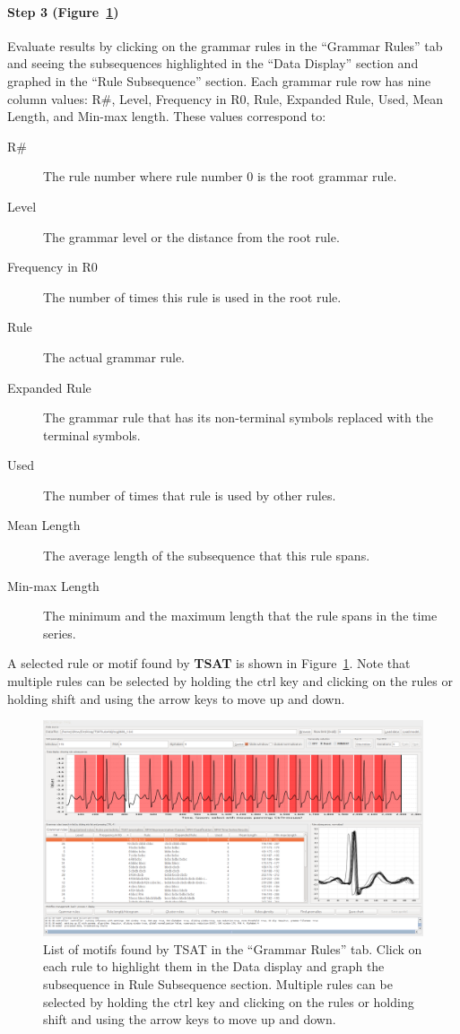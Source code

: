 \documentclass[titlepage, letterpaper, 12pt]{article}
\newcommand\TSAT{\textbf{TSAT}}
\begin{document}
\paragraph{Step 3 (Figure~\ref{fig:step3-motifs})} Evaluate results by clicking on the grammar rules in the ``Grammar Rules'' tab and seeing the subsequences highlighted in the ``Data Display'' section and graphed in the ``Rule Subsequence'' section.  Each grammar rule row has nine column values: R\#, Level, Frequency in R0, Rule, Expanded Rule, Used, Mean Length, and Min-max length.  These values correspond to:

\begin{description}
	\item[R\#] The rule number where rule number 0 is the root grammar rule.
	\item[Level]  The grammar level or the distance from the root rule.
	\item[Frequency in R0]  The number of times this rule is used in the root rule.
	\item[Rule] The actual grammar rule.
	\item[Expanded Rule]  The grammar rule that has its non-terminal symbols replaced with the terminal symbols.
	\item[Used]  The number of times that rule is used by other rules.
	\item[Mean Length] The average length of the subsequence that this rule spans.
	\item[Min-max Length] The minimum and the maximum length that the rule spans in the time series.
\end{description}

A selected rule or motif found by {\TSAT} is shown in Figure~\ref{fig:step3-motifs}.  Note that multiple rules can be selected by holding the ctrl key and clicking on the rules or holding shift and using the arrow keys to move up and down.

\begin{figure}[H]
	\centering
	\includegraphics[width=0.7\linewidth]{pictures/motifguide/step3-motifs}
	\caption{List of motifs found by TSAT in the ``Grammar Rules'' tab.  Click on each rule to highlight them in the Data display and graph the subsequence in Rule Subsequence section.  Multiple rules can be selected by holding the ctrl key and clicking on the rules or holding shift and using the arrow keys to move up and down.}
	\label{fig:step3-motifs}
\end{figure}
\end{document}

